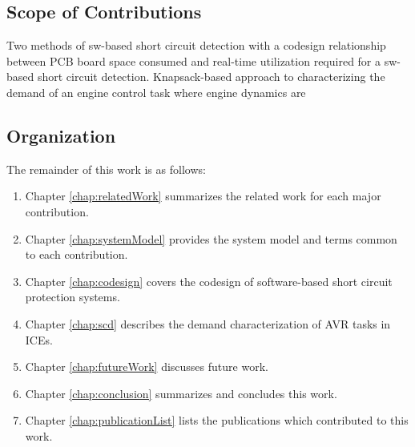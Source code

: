 \subsection{Scope of Contributions}

Two methods of sw-based short circuit detection with a codesign relationship between PCB board space consumed and real-time utilization required for a sw-based short circuit detection.
Knapsack-based approach to characterizing the demand of an engine control task where engine dynamics are 

\subsection{Organization}

The remainder of this work is as follows:

\begin{enumerate}
    \item Chapter \ref{chap:relatedWork} summarizes the related work for each major contribution.
    \item Chapter \ref{chap:systemModel} provides the system model and terms common to each contribution.
    \item Chapter \ref{chap:codesign} covers the codesign of software-based short circuit protection systems.
    \item Chapter \ref{chap:scd} describes the demand characterization of AVR tasks in ICEs.
    \item Chapter \ref{chap:futureWork} discusses future work.
    \item Chapter \ref{chap:conclusion} summarizes and concludes this work.
    \item Chapter \ref{chap:publicationList} lists the publications which contributed to this work.
\end{enumerate}